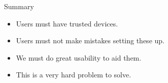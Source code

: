 %
%
%  

\begin{frame}
  \begin{block}{Summary}
    \begin{itemize}
      \item Users must have trusted devices.
      \item Users must not make mistakes setting these up.
      \item We must do great usability to aid them.
    \end{itemize}
  \end{block}

  \pause

  \begin{remark}
    \begin{itemize}
      \item This is a very hard problem to solve.
    \end{itemize}
  \end{remark}
\end{frame}




\begin{frame}[allowframebreaks]
	\small
  \printbibliography
\end{frame}

